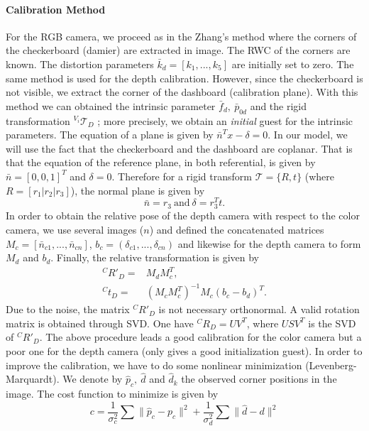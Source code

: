 \documentclass[11pt,a4paper]{article}
\begin{document}
\paragraph{Calibration Method} For the RGB camera, we proceed as in the Zhang's method \cite{Zhang2000} where the corners of the checkerboard (damier) are extracted in image. The RWC of the corners are known. The distortion parameters $\bar{k}_d = [k_1,...,k_5]$ are initially set to zero. The same method is used for the depth calibration. However, since the checkerboard is not visible, we extract the corner of the dashboard (calibration plane). With this method we can obtained the intrinsic parameter $\bar{f}_d,~\bar{p}_{0d}$ and the rigid transformation $^{V_i}\mathcal{T}_D$ ; more precisely, we obtain an \textit{initial} guest for the intrinsic parameters. The equation of a plane is given by $\bar{n}^Tx-\delta = 0$. In our model, we will use the fact that the checkerboard and the dashboard are coplanar. That is that the equation of the reference plane, in both referential, is given by $\bar{n}=[0,0,1]^T$ and $\delta = 0$. Therefore for a rigid transform $\mathcal{T}=\{R,t\}$ (where $R=[r_1|r_2|r_3]$), the normal plane is given by
\begin{equation}
\bar{n} = r_3 ~\text{and}~\delta = r_3^T t.
\end{equation}
In order to obtain the relative pose of the depth camera with respect to the color camera, we use several images ($n$) and defined the concatenated matrices $M_c=[\bar{n}_{c1},...,\bar{n}_{cn}]$, $b_c=(\delta_{c1},...,\delta_{cn})$ and likewise for the depth camera to form $M_d$ and $b_d$. Finally, the relative transformation is given by
\begin{align}
^C R'_D = & M_d M_c^T, \\
^Ct_D = & (M_cM_c^T)^{-1}M_c(b_c-b_d)^T.
\end{align}
Due to the noise, the matrix $^C R'_D$ is not necessary orthonormal. A valid rotation matrix is obtained through SVD. One have $^C R_D = UV^T$, where $USV^T$ is the SVD of $^C R'_D$. The above procedure leads a good calibration for the color camera but a poor one for the depth camera (only gives a good initialization guest). In order to improve the calibration, we have to do some nonlinear minimization (Levenberg-Marquardt). We denote by $\hat{p}_c,~\hat{d}$ and $\hat{d}_k$ the observed corner positions in the image. The cost function to minimize is given by
\begin{equation}
c = \frac{1}{\sigma_c^2}\sum \| \hat{p}_c-p_c \|^2 + \frac{1}{\sigma_d^2}\sum \| \hat{d}-d \|^2 
\end{equation}
\end{document}
